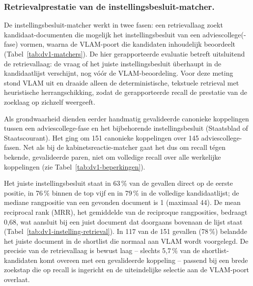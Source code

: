 
\subsubsection{Retrievalprestatie van de instellingsbesluit-matcher.}
De instellingsbesluit-matcher werkt in twee fasen: een retrievallaag zoekt
kandidaat-documenten die mogelijk het instellingsbesluit van een
adviescollege(-fase) vormen, waarna de VLAM-poort die kandidaten inhoudelijk
beoordeelt (Tabel~\ref{tab:dv1-matchers}). De hier gerapporteerde evaluatie
betreft uitsluitend de retrievallaag: de vraag of het juiste instellingsbesluit
\"uberhaupt in de kandidaatlijst verschijnt, nog v\'o\'or de VLAM-beoordeling.
Voor deze meting stond VLAM uit en draaide alleen de deterministische, tekstuele
retrieval met heuristische herrangschikking, zodat de gerapporteerde recall de
prestatie van de zoeklaag op zichzelf weergeeft.

\noindent Als grondwaarheid dienden eerder handmatig gevalideerde canonieke
koppelingen tussen een adviescollege-fase en het bijbehorende instellingsbesluit
(Staatsblad of Staatscourant). Het ging om 151 canonieke koppelingen over 145
adviescollege-fasen. Net als bij de kabinetsreactie-matcher gaat het dus om
recall t\'egen bekende, gevalideerde paren, niet om volledige recall over alle
werkelijke koppelingen (zie Tabel~\ref{tab:dv1-beperkingen}).

\noindent Het juiste instellingsbesluit staat in 63\,\% van de gevallen direct op
de eerste positie, in 76\,\% binnen de top vijf en in 79\,\% in de volledige
kandidaatlijst; de mediane rangpositie van een gevonden document is 1 (maximaal
44). De mean reciprocal rank (MRR), het gemiddelde van de reciproque
rangposities, bedraagt 0,68, wat aansluit bij een juist document dat doorgaans
bovenaan de lijst staat (Tabel~\ref{tab:dv1-instelling-retrieval}). In 117 van de
151 gevallen (78\,\%) belandde het juiste document in de shortlist die normaal
aan VLAM wordt voorgelegd. De precisie van de retrievallaag is bewust laag --
slechts 5,7\,\% van de shortlist-kandidaten komt overeen met een gevalideerde
koppeling -- passend bij een brede zoekstap die op recall is ingericht en de
uiteindelijke selectie aan de VLAM-poort overlaat.

